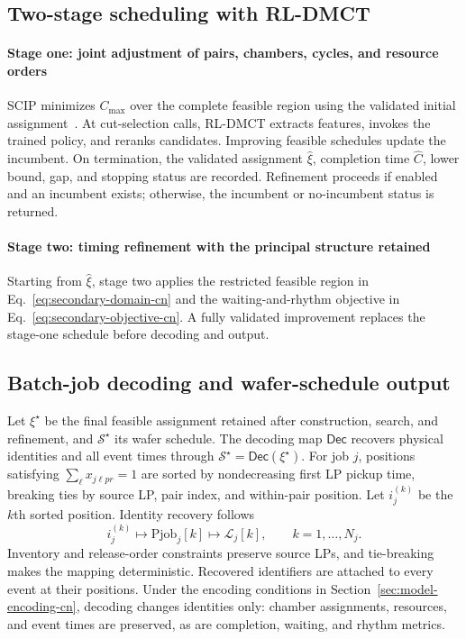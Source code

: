 \documentclass[final,5p,times,twocolumn]{elsarticle}
\begin{document}
\subsection{Two-stage scheduling with RL-DMCT}
\paragraph{Stage one: joint adjustment of pairs, chambers, cycles, and resource orders}
SCIP minimizes $C_{\max}$ over the complete feasible region using the validated initial assignment~\citep{achterberg2009scip,bestuzheva2023scip}. At cut-selection calls, RL-DMCT extracts features, invokes the trained policy, and reranks candidates. Improving feasible schedules update the incumbent. On termination, the validated assignment $\widehat\xi$, completion time $\widehat C$, lower bound, gap, and stopping status are recorded. Refinement proceeds if enabled and an incumbent exists; otherwise, the incumbent or no-incumbent status is returned.

\paragraph{Stage two: timing refinement with the principal structure retained}
Starting from $\widehat\xi$, stage two applies the restricted feasible region in Eq.~\eqref{eq:secondary-domain-cn} and the waiting-and-rhythm objective in Eq.~\eqref{eq:secondary-objective-cn}. A fully validated improvement replaces the stage-one schedule before decoding and output.

\subsection{Batch-job decoding and wafer-schedule output}
\label{sec:pjob-decoding-cn}
Let $\xi^\star$ be the final feasible assignment retained after construction, search, and refinement, and $\mathcal S^\star$ its wafer schedule. The decoding map $\mathsf{Dec}$ recovers physical identities and all event times through $\mathcal S^\star=\mathsf{Dec}(\xi^\star)$. For job $j$, positions satisfying $\sum_\ell x_{j\ell pr}=1$ are sorted by nondecreasing first LP pickup time, breaking ties by source LP, pair index, and within-pair position. Let $i_j^{(k)}$ be the $k$th sorted position. Identity recovery follows
\begin{equation}
i_j^{(k)}\longmapsto\mathrm{Pjob}_j[k]
\longmapsto\mathcal L_j[k],\qquad k=1,\ldots,N_j.
\label{eq:pjob-decoding-cn}
\end{equation}
Inventory and release-order constraints preserve source LPs, and tie-breaking makes the mapping deterministic. Recovered identifiers are attached to every event at their positions. Under the encoding conditions in Section~\ref{sec:model-encoding-cn}, decoding changes identities only: chamber assignments, resources, and event times are preserved, as are completion, waiting, and rhythm metrics.
\end{document}

